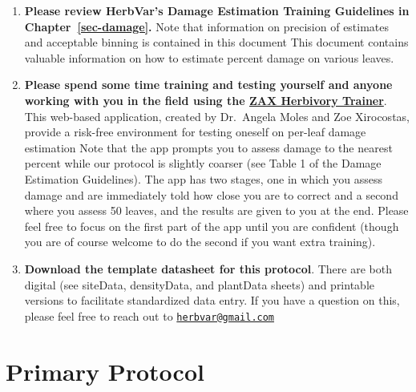 \documentclass[
  letterpaper,
  DIV=11,
  numbers=noendperiod]{scrreprt}
\begin{document}
\begin{enumerate}
\def\labelenumi{\arabic{enumi}.}
\item
  \textbf{Please review HerbVar's Damage Estimation Training Guidelines
  in Chapter~\ref{sec-damage}.} Note that information on precision of
  estimates and acceptable binning is contained in this document This
  document contains valuable information on how to estimate percent
  damage on various leaves.\\
\item
  \textbf{Please spend some time training and testing yourself and
  anyone working with you in the field using the
  \href{https://zaxherbivorytrainer.com/}{ZAX Herbivory Trainer}}. This
  web-based application, created by Dr.~Angela Moles and Zoe Xirocostas,
  provide a risk-free environment for testing oneself on per-leaf damage
  estimation Note that the app prompts you to assess damage to the
  nearest percent while our protocol is slightly coarser (see Table 1 of
  the Damage Estimation Guidelines). The app has two stages, one in
  which you assess damage and are immediately told how close you are to
  correct and a second where you assess 50 leaves, and the results are
  given to you at the end. Please feel free to focus on the first part
  of the app until you are confident (though you are of course welcome
  to do the second if you want extra training).
\item
  \textbf{Download the template datasheet for this protocol}. There are
  both digital (see siteData, densityData, and plantData sheets) and
  printable versions to facilitate standardized data entry. If you have
  a question on this, please feel free to reach out to
  \href{mailto:herbvar@gmail.com}{\nolinkurl{herbvar@gmail.com}}
\end{enumerate}

\section{Primary Protocol}\label{primary-protocol-1}
\end{document}
